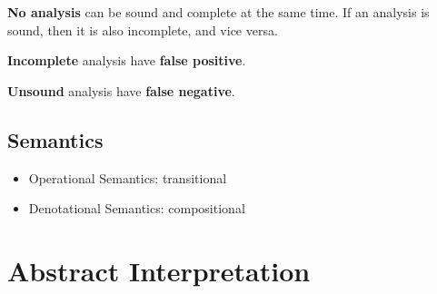 \documentclass[12pt, twopage]{book}
\begin{document}
\textbf{No analysis} can be sound and complete at the same time. If an
analysis is sound, then it is also incomplete, and vice versa.

\textbf{Incomplete} analysis have \textbf{false positive}.

\textbf{Unsound} analysis have \textbf{false negative}.


\section{Semantics}
\label{sec:semantics}

\begin{itemize}
\item Operational Semantics: transitional
\item Denotational Semantics: compositional
\end{itemize}


\chapter{Abstract Interpretation}
\label{chap:ai}
\end{document}
